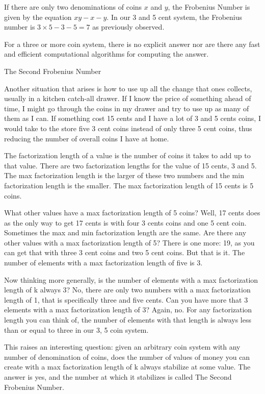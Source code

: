 \documentclass{article}
\begin{document}
If there are only two denominations of coins \(x\) and \(y\), the Frobenius Number is given by the equation \(xy - x - y \). In our 3 and 5 cent system, the Frobenius number is \(3 \times 5 - 3 - 5 = 7\) as previously observed.

For a three or more coin system, there is no explicit answer nor are there any fast and efficient computational algorithms for computing the answer.


The Second Frobenius Number


Another situation that arises is how to use up all the change that ones collects, usually in a kitchen catch-all drawer. If I know the price of something ahead of time, I might go through the coins in my drawer and try to use up as many of them as I can. If something cost 15 cents and I have a lot of 3 and 5 cents coins, I would take to the store five 3 cent coins instead of only three 5 cent coins, thus reducing the number of overall coins I have at home. 

The factorization length of a value is the number of coins it takes to add up to that value. There are two factorization lengths for the value of 15 cents, 3 and 5. The max factorization length is the larger of these two numbers and the min factorization length is the smaller. The max factorization length of 15 cents is 5 coins. 

What other values have a max factorization length of 5 coins? Well, 17 cents does as the only way to get 17 cents is with four 3 cents coins and one 5 cent coin. Sometimes the max and min factorization length are the same. Are there any other values with a max factorization length of 5? There is one more: 19, as you can get that with three 3 cent coins and two 5 cent coins. But that is it. The number of elements with a max factorization length of five is 3. 

Now thinking more generally, is the number of elements with a max factorization length of k always 3? No, there are only two numbers with a max factorization length of 1, that is specifically three and five cents. Can you have more that 3 elements with a max factorization length of 3? Again, no. For any factorization length you can think of, the number of elements with that length is always less than or equal to three in our 3, 5 coin system.

This raises an interesting question: given an arbitrary coin system with any number of denomination of coins, does the number of values of money you can create with a max factorization length of k always stabilize at some value. The answer is yes, and the number at which it stabilizes is called The Second Frobenius Number. 
\end{document}
